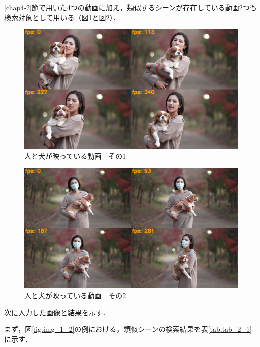 \documentclass[a4j,12pt,dvipdfmx]{jreport}
\begin{document}
\ref{chap4-2}節で用いた4つの動画に加え，類似するシーンが存在している動画2つも検索対象として用いる（図\ref{fig:movie7}と図\ref{fig:movie8}）．
\begin{figure}[t]
  \centering
  \includegraphics[width=13cm]{image/7_result.jpg}
  \caption{人と犬が映っている動画　その1}
  \label{fig:movie7}
\end{figure}

\begin{figure}[t]
  \centering
  \includegraphics[width=13cm]{image/8_result.jpg}
  \caption{人と犬が映っている動画　その2}
  \label{fig:movie8}
\end{figure}

次に入力した画像と結果を示す．

まず，図\ref{fig:img_1_2}の例における，類似シーンの検索結果を表\ref{tab:tab_2_1}に示す．
\end{document}
